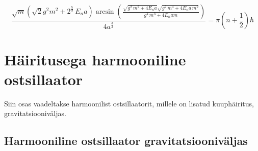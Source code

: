 \documentclass{trkut}%
\begin{document}
\begin{equation}
    \frac{\sqrt{m} \left( \sqrt{2} {g}^{2} m^2 + {{2}^{\frac{5}{2}}}\, {E_n} a\right)  \arcsin\left( \frac{\sqrt{{{g}^{2}}\, {{m}^{2}}+4 {E_n} a} \sqrt{{{g}^{2}}\, {{m}^{4}}+4 {E_n} a\, {{m}^{2}}}}{{{g}^{2}}\, {{m}^{3}}+4 {E_n} a m}\right) }{4 {{a}^{\frac{3}{2}}}}=\ensuremath{\pi}  \left( n+\frac{1}{2}\right)  \hbar
\end{equation}

\section{Häiritusega harmooniline ostsillaator}

Siin osas vaadeltakse harmoonilist ostsillaatorit, millele on lisatud kuuphäiritus, gravitatsiooniväljas.

\subsection{Harmooniline ostsillaator gravitatsiooniväljas}
\end{document}
